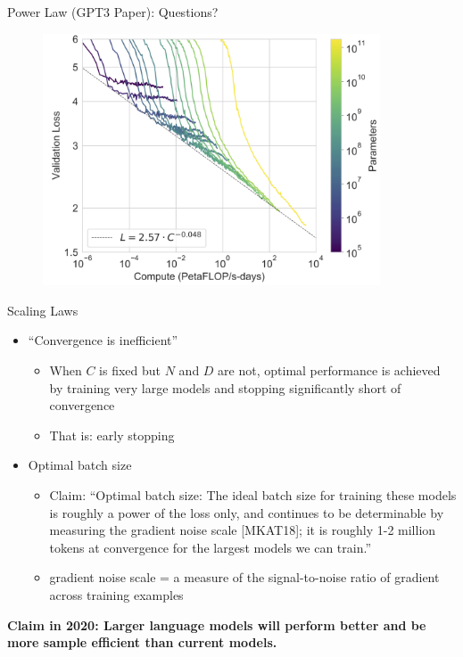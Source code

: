 \begin{vbframe}{Power Law (GPT3 Paper): Questions?}

\begin{figure}
    \centering
    \includegraphics[width=10cm]{figure/losscompute.png}
\end{figure}
    
\end{vbframe}


\begin{vbframe}{Scaling Laws}

\vfill

\begin{itemize}

	\item ``Convergence is inefficient''
	\begin{itemize}
	\item When $C$ is fixed but $N$ and $D$ are not, optimal performance is achieved by training very large models and stopping significantly short of convergence  
        \item That is: early stopping
	\end{itemize}

	\item Optimal batch size
	\begin{itemize}
    	\item Claim: “Optimal batch size: The ideal batch size for training these
                models is roughly a power of the loss only, and continues to
                be determinable by measuring the gradient noise scale
                [MKAT18]; it is roughly 1-2 million tokens at convergence for
                the largest models we can train.”
    	\item gradient noise scale = a measure of the signal-to-noise ratio
            of gradient across training examples
	\end{itemize}

\end{itemize}

\vskip3mm

\textbf{Claim in 2020: Larger language models will perform better and be more sample efficient than current models.} 

\vfill

\end{vbframe}

